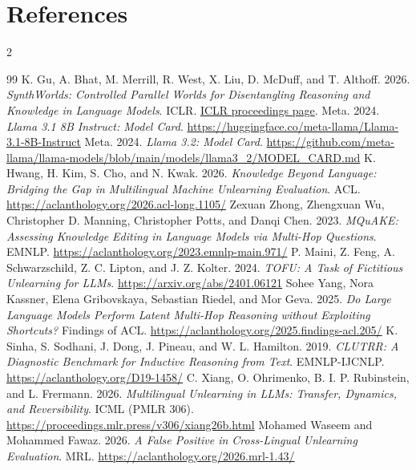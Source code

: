 \documentclass[10pt,a4paper]{article}
\begin{document}
\section{References}
{\footnotesize\setlength{\parskip}{1pt}
\setlength{\columnsep}{1cm}\begin{multicols}{2}
\begin{thebibliography}{99}
 K. Gu, A. Bhat, M. Merrill, R. West, X. Liu, D. McDuff, and T. Althoff. 2026. \emph{SynthWorlds: Controlled Parallel Worlds for Disentangling Reasoning and Knowledge in Language Models}. ICLR. \href{https://proceedings.iclr.cc/paper_files/paper/2026/hash/b213d870740582dd6af77bbdaed900c9-Abstract-Conference.html}{ICLR proceedings page}.
 Meta. 2024. \emph{Llama 3.1 8B Instruct: Model Card}. \url{https://huggingface.co/meta-llama/Llama-3.1-8B-Instruct}
 Meta. 2024. \emph{Llama 3.2: Model Card}. \url{https://github.com/meta-llama/llama-models/blob/main/models/llama3_2/MODEL_CARD.md}
 K. Hwang, H. Kim, S. Cho, and N. Kwak. 2026. \emph{Knowledge Beyond Language: Bridging the Gap in Multilingual Machine Unlearning Evaluation}. ACL. \url{https://aclanthology.org/2026.acl-long.1105/}
 Zexuan Zhong, Zhengxuan Wu, Christopher D. Manning, Christopher Potts, and Danqi Chen. 2023. \emph{MQuAKE: Assessing Knowledge Editing in Language Models via Multi-Hop Questions}. EMNLP. \url{https://aclanthology.org/2023.emnlp-main.971/}
 P. Maini, Z. Feng, A. Schwarzschild, Z. C. Lipton, and J. Z. Kolter. 2024. \emph{TOFU: A Task of Fictitious Unlearning for LLMs}. \url{https://arxiv.org/abs/2401.06121}
 Sohee Yang, Nora Kassner, Elena Gribovskaya, Sebastian Riedel, and Mor Geva. 2025. \emph{Do Large Language Models Perform Latent Multi-Hop Reasoning without Exploiting Shortcuts?} Findings of ACL. \url{https://aclanthology.org/2025.findings-acl.205/}
 K. Sinha, S. Sodhani, J. Dong, J. Pineau, and W. L. Hamilton. 2019. \emph{CLUTRR: A Diagnostic Benchmark for Inductive Reasoning from Text}. EMNLP-IJCNLP. \url{https://aclanthology.org/D19-1458/}
 C. Xiang, O. Ohrimenko, B. I. P. Rubinstein, and L. Frermann. 2026. \emph{Multilingual Unlearning in LLMs: Transfer, Dynamics, and Reversibility}. ICML (PMLR 306). \url{https://proceedings.mlr.press/v306/xiang26b.html}
 Mohamed Waseem and Mohammed Fawaz. 2026. \emph{A False Positive in Cross-Lingual Unlearning Evaluation}. MRL. \url{https://aclanthology.org/2026.mrl-1.43/}

\end{thebibliography}
\end{multicols}}
\end{document}
